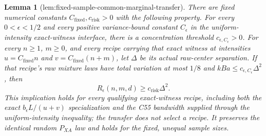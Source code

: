 \documentclass{article}
\newtheorem{lemma}{Lemma}
\begin{document}
\begin{lemma}[lem:fixed-sample-common-marginal-transfer]\label{lem:fixed-sample-common-marginal-transfer}
There are fixed numerical constants \(C_{\mathrm{fixed}},c_{\mathrm{risk}}>0\) with the following property.  For every \(0<\epsilon<1/2\) and every positive variance-bound constant \(C_\epsilon\) in the uniform-intensity exact-witness interface, there is a concentration threshold \(c_{\epsilon,C_\epsilon}>0\).  For every \(n\ge1\), \(m\ge0\), and every recipe carrying that exact witness at intensities \(u=C_{\mathrm{fixed}}n\) and \(v=C_{\mathrm{fixed}}(n+m)\), let \(\Delta\) be its actual raw-center separation.  If that recipe's raw mixture laws have total variation at most \(1/8\) and \(kBa\le c_{\epsilon,C_\epsilon}\Delta^2\), then
\[
 R_\epsilon(n,m,d)\ge c_{\mathrm{risk}}\Delta^2.
\]
This implication holds for every qualifying exact-witness recipe, including both the exact \(b_\epsilon L/(u+v)\) specialization and the C55 bandwidth supplied through the uniform-intensity inequality; the transfer does not select a recipe.  It preserves the identical random \(P_{XA}\) law and holds for the fixed, unequal sample sizes.
\end{lemma}
\end{document}
